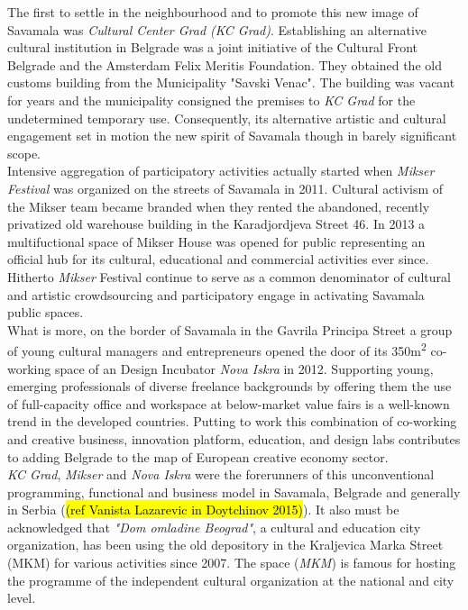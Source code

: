\documentclass[11pt]{report}
\begin{document}
The first to settle in the neighbourhood and to promote this new image of Savamala was \textit{Cultural Center Grad (KC Grad)}. Establishing an alternative cultural institution in Belgrade was a joint initiative of the Cultural Front Belgrade and the Amsterdam Felix Meritis Foundation.
They obtained the old customs building from the Municipality "Savski Venac".
The building was vacant for years and the municipality consigned the premises to \textit{KC Grad} for the undetermined temporary use.
Consequently, its alternative artistic and cultural engagement set in motion the new spirit of Savamala though in barely significant scope.
\\
Intensive aggregation of participatory activities actually started when \textit{Mikser Festival} was organized on the streets of Savamala in 2011.
Cultural activism of the Mikser team became branded when they rented the abandoned, recently privatized old warehouse building in the Karadjordjeva Street 46.
In 2013 a multifuctional space of Mikser House was opened for public representing an official hub for its cultural, educational and commercial activities ever since. Hitherto \textit{Mikser} Festival continue to serve as a common denominator of cultural and artistic crowdsourcing and participatory engage in activating Savamala public spaces.
\\
What is more, on the border of Savamala in the Gavrila Principa Street a group of young cultural managers and entrepreneurs opened the door of its 350m\textsuperscript{2} co-working space of an Design Incubator \textit{Nova  Iskra} in 2012.
Supporting young, emerging professionals of diverse freelance backgrounds by offering them the use of full-capacity office and workspace at below-market value fairs is a well-known trend in the developed countries. Putting to work this combination of co-working and creative business, innovation platform, education, and design labs contributes to adding Belgrade to the map of European creative economy sector. 
\\
\textit{KC Grad}, \textit{Mikser} and \textit{Nova Iskra} were the forerunners of this unconventional programming, functional and business model in Savamala, Belgrade and generally in Serbia (\hl{(ref Vanista Lazarevic in Doytchinov 2015)}). 
It also must be acknowledged that \textit{"Dom omladine Beograd"}, a cultural and education city organization, has been using the old depository in the Kraljevica Marka Street (MKM) for various activities since 2007.
The space (\textit{MKM}) is famous for hosting the programme of the independent cultural organization at the national and city level.
\end{document}
